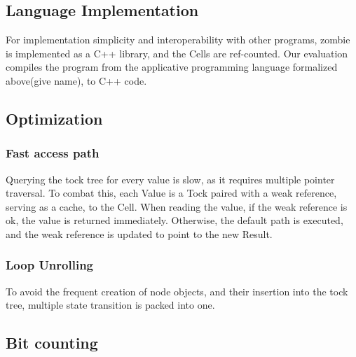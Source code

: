 \subsection{Language Implementation}
For implementation simplicity and interoperability with other programs, zombie is implemented as a C++ library, and the Cells are ref-counted. Our evaluation compiles the program from the applicative programming language formalized above(give name), to C++ code.
\subsection{Optimization}
\subsubsection{Fast access path}
Querying the tock tree for every value is slow, as it requires multiple pointer traversal.
To combat this, each Value is a Tock paired with a weak reference, serving as a cache, to the Cell. When reading the value, if the weak reference is ok, the value is returned immediately. Otherwise, the default path is executed, and the weak reference is updated to point to the new Result.
\subsubsection{Loop Unrolling}
To avoid the frequent creation of node objects, and their insertion into the tock tree, multiple state transition is packed into one.
\subsection{Bit counting}

